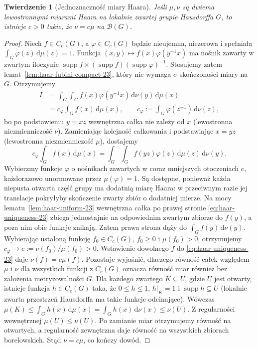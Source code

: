 \documentclass[11pt,a4paper,oneside]{book}
\numberwithin{equation}{chapter}
\theoremstyle{plain}
\newtheorem{twierdzenie}{Twierdzenie}[chapter]
\theoremstyle{definition}
\theoremstyle{remark}
\begin{document}
\begin{twierdzenie}[Jednoznaczność miary Haara]
\label{thm:haar-unique-23}
Jeśli $\mu,\nu$ są dwiema lewostronnymi miarami Haara
na lokalnie zwartej grupie Hausdorffa $G$, to istnieje
$c>0$ takie, że $\nu=c\mu$ na $\mathcal B(G)$.
\end{twierdzenie}
\begin{proof}
Niech $f\in C_c(G)$, a $\varphi\in C_c(G)$ będzie
nieujemna, niezerowa i spełniała
$\int_G\varphi(z)\,\mathrm d\mu(z)=1$.
Funkcja $(x,y)\mapsto f(x)\varphi(y^{-1}x)$
ma nośnik zawarty w zwartym iloczynie
$\operatorname{supp}f\times
(\operatorname{supp}f)(\operatorname{supp}\varphi)^{-1}$.
Stosujemy zatem lemat~\ref{lem:haar-fubini-compact-23},
który nie wymaga $\sigma$-skończoności miary na $G$.
Otrzymujemy
\begin{align*}
 I&=\int_G\!\int_G f(x)\varphi(y^{-1}x)
       \,\mathrm d\nu(y)\,\mathrm d\mu(x)\\
  &=c_\varphi\int_Gf(x)\,\mathrm d\mu(x),\qquad
 c_\varphi:=\int_G\varphi(z^{-1})\,\mathrm d\nu(z),
\end{align*}
bo po podstawieniu $y=xz$ wewnętrzna całka nie
zależy od $x$ (lewostronna niezmienniczość $\nu$).
Zamieniając kolejność całkowania i podstawiając
$x=yz$ (lewostronna niezmienniczość $\mu$), dostajemy
\begin{equation}\label{eq:haar-uniqueness-23}
 c_\varphi\int_G f(x)\,\mathrm d\mu(x)
 =\int_G\!\int_G f(yz)\varphi(z)
       \,\mathrm d\mu(z)\,\mathrm d\nu(y).
\end{equation}
Wybierzmy funkcje $\varphi$ o nośnikach zawartych
w coraz mniejszych otoczeniach $e$, każdorazowo
unormowane przez $\mu(\varphi)=1$. Są dostępne,
ponieważ każda niepusta otwarta część grupy ma
dodatnią miarę Haara: w przeciwnym razie jej
translacje pokryłyby skończenie zwarty zbiór
o dodatniej mierze.
Na mocy lematu~\ref{lem:haar-uniform-23}
wewnętrzna całka po prawej stronie
\eqref{eq:haar-uniqueness-23} zbiega jednostajnie
na odpowiednim zwartym zbiorze do $f(y)$,
a poza nim obie funkcje znikają.
Zatem prawa strona dąży do $\int_Gf(y)\,\mathrm d\nu(y)$.
Wybierając ustaloną funkcję $f_0\in C_c(G)$,
$f_0\ge0$ i $\mu(f_0)>0$, otrzymujemy
$c_\varphi\to c:=\nu(f_0)/\mu(f_0)>0$.
Wstawienie dowolnego $f$ do
\eqref{eq:haar-uniqueness-23} daje
$\nu(f)=c\mu(f)$. Pozostaje wyjaśnić, dlaczego równość całek względem
$\mu$ i $\nu$ dla wszystkich funkcji z $C_c(G)$ oznacza
równość miar również bez założenia metryzowalności $G$.
Dla każdego zwartego $K\subseteq U$, gdzie $U$ jest otwarty,
istnieje funkcja $h\in C_c(G)$ taka, że
$0\le h\le1$, $h|_K=1$ i $\operatorname{supp}h\subseteq U$
(lokalnie zwarta przestrzeń Hausdorffa ma takie funkcje
odcinające). Wówczas $\mu(K)\le\int_Gh(x)\,\mathrm d\mu(x)
=\int_Gh(x)\,\mathrm d\nu(x)\le\nu(U)$. Z regularności
wewnętrznej $\mu(U)\le\nu(U)$. Po zamianie miar
otrzymujemy równość na otwartych, a regularność zewnętrzna
daje równość na wszystkich zbiorach borelowskich.
Stąd $\nu=c\mu$, co kończy dowód.
\end{proof}
\end{document}
